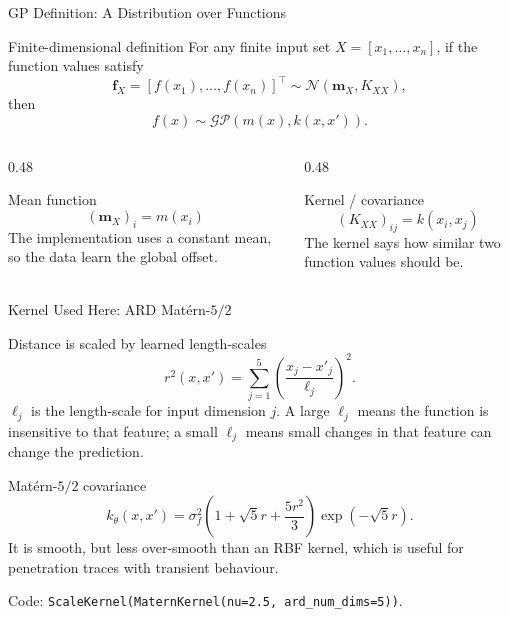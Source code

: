 \documentclass[UTF8,aspectratio=169]{ctexbeamer}
\begin{document}
\begin{frame}{GP Definition: A Distribution over Functions}
\small
\begin{block}{Finite-dimensional definition}
\footnotesize
For any finite input set \(X=[x_1,\ldots,x_n]\), if the function values satisfy
\[
\mathbf f_X=[f(x_1),\ldots,f(x_n)]^\top
\sim
\mathcal N(\mathbf m_X,K_{XX}),
\]
then
\[
f(x)\sim\mathcal{GP}(m(x),k(x,x')).
\]
\end{block}

\begin{columns}[T,onlytextwidth]
\begin{column}{0.48\linewidth}
\begin{block}{Mean function}
\footnotesize
\[
(\mathbf m_X)_i=m(x_i)
\]
The implementation uses a constant mean, so the data learn the global offset.
\end{block}
\end{column}
\begin{column}{0.48\linewidth}
\begin{block}{Kernel / covariance}
\footnotesize
\[
(K_{XX})_{ij}=k(x_i,x_j)
\]
The kernel says how similar two function values should be.
\end{block}
\end{column}
\end{columns}
\end{frame}

\begin{frame}{Kernel Used Here: ARD Matérn-\(5/2\)}
\small
\begin{block}{Distance is scaled by learned length-scales}
\footnotesize
\[
r^2(x,x')=\sum_{j=1}^{5}\left(\frac{x_j-x'_j}{\ell_j}\right)^2.
\]
\(\ell_j\) is the length-scale for input dimension \(j\). A large \(\ell_j\)
means the function is insensitive to that feature; a small \(\ell_j\) means
small changes in that feature can change the prediction.
\end{block}

\begin{block}{Matérn-\(5/2\) covariance}
\footnotesize
\[
k_\theta(x,x')=\sigma_f^2
\left(1+\sqrt{5}r+\frac{5r^2}{3}\right)\exp(-\sqrt{5}r).
\]
It is smooth, but less over-smooth than an RBF kernel, which is useful for
penetration traces with transient behaviour.
\end{block}

\vspace{-0.2em}
\footnotesize
Code: \texttt{ScaleKernel(MaternKernel(nu=2.5, ard\_num\_dims=5))}.
\end{frame}
\end{document}

